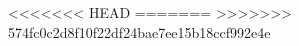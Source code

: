 \renewcommand{\CourseName}{Основы Комбинаторики и Теории Чисел}
\renewcommand{\FullCourseNameFirstPart}{\so{ОСНОВЫ КОМБИНАТОРИКИ И ТЕОРИИ ЧИСЕЛ}}
\renewcommand{\SemesterNumber}{II}
\renewcommand{\LecturerInitials}{Райгородский}
\renewcommand{\CourseDate}{весна 2025}
\renewcommand{\AuthorInitials}{Киселев Николай}
<<<<<<< HEAD
\renewcommand{\AuthorLink}{\stupidlucy \\\ivanbir}
=======
\renewcommand{\AuthorLink}{\stupidlucy}
>>>>>>> 574fc0c2d8f10f22df24bae7ee15b18ccf992e4e
